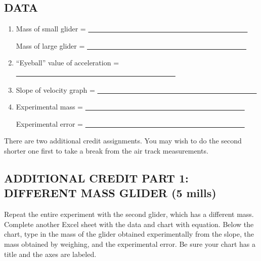 \subsection*{DATA}

\begin{enumerate}[label=\arabic*.]

\item Mass of small glider = \ul{~~~~~~~~~~~~~~~~~~~~~~~~~~~~~~~~~~~~~~~~~~~~~}

Mass of large glider = \ul{~~~~~~~~~~~~~~~~~~~~~~~~~~~~~~~~~~~~~~~~~~~~~}

\setcounter{enumi}{4}
\item ``Eyeball'' value of acceleration = \ul{~~~~~~~~~~~~~~~~~~~~~~~~~~~~~~~~~~~~~~~~~~~~~}

\item Slope of velocity graph = \ul{~~~~~~~~~~~~~~~~~~~~~~~~~~~~~~~~~~~~~~~~~~~~~}

\setcounter{enumi}{16}
\item Experimental mass = \ul{~~~~~~~~~~~~~~~~~~~~~~~~~~~~~~~~~~~~~~~~~~~~~}

Experimental error = \ul{~~~~~~~~~~~~~~~~~~~~~~~~~~~~~~~~~~~~~~~~~~~~~}

\end{enumerate}

There are two additional credit assignments.  You may wish to do the second shorter one first to take a break from the air track measurements.

\subsection*{ADDITIONAL CREDIT PART 1: DIFFERENT MASS GLIDER (5 mills)}

Repeat the entire experiment with the second glider, which has a different mass.  Complete another Excel sheet with the data and chart with equation.  Below the chart, type in the mass of the glider obtained experimentally from the slope, the mass obtained by weighing, and the experimental error.  Be sure your chart has a title and the axes are labeled.


